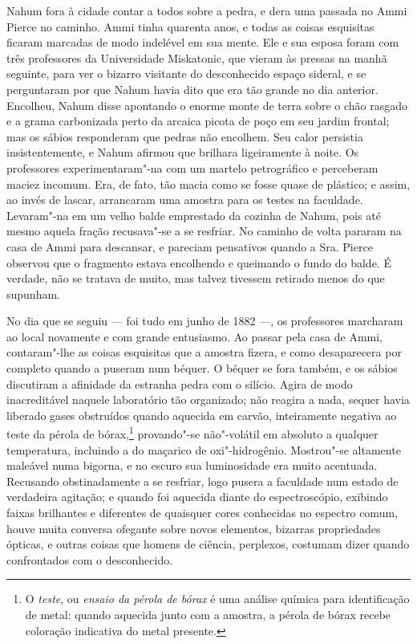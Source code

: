 Nahum fora à cidade contar a todos sobre a pedra, e dera uma passada no
Ammi Pierce no caminho. Ammi tinha quarenta anos, e todas as coisas
esquisitas ficaram marcadas de modo indelével em sua mente. Ele e sua
esposa foram com três professores da Universidade Miskatonic, que vieram
às pressas na manhã seguinte, para ver o bizarro visitante do
desconhecido espaço sideral, e se perguntaram por que Nahum havia dito
que era tão grande no dia anterior. Encolheu, Nahum disse apontando o
enorme monte de terra sobre o chão rasgado e a grama carbonizada perto
da arcaica picota de poço em seu jardim frontal; mas os sábios
responderam que pedras não encolhem. Seu calor persistia
insistentemente, e Nahum afirmou que brilhara ligeiramente à noite. Os
professores experimentaram"-na com um martelo petrográfico e perceberam
maciez incomum. Era, de fato, tão macia como se fosse quase de plástico;
e assim, ao invés de lascar, arrancaram uma amostra para os testes na
faculdade. Levaram"-na em um velho balde emprestado da cozinha de Nahum,
pois até mesmo aquela fração recusava"-se a se resfriar. No caminho de
volta pararam na casa de Ammi para descansar, e pareciam pensativos
quando a Sra. Pierce observou que o fragmento estava encolhendo e
queimando o fundo do balde. É verdade, não se tratava de muito, mas
talvez tivessem retirado menos do que supunham.

No dia que se seguiu --- foi tudo em junho de 1882 ---, os professores
marcharam ao local novamente e com grande entusiasmo. Ao passar pela
casa de Ammi, contaram"-lhe as coisas esquisitas que a amostra fizera, e
como desaparecera por completo quando a puseram num béquer. O béquer se
fora também, e os sábios discutiram a afinidade da estranha pedra com o
silício. Agira de modo inacreditável naquele laboratório tão organizado;
não reagira a nada, sequer havia liberado gases obstruídos quando
aquecida em carvão, inteiramente negativa ao teste da pérola de
bórax,\footnote{O \emph{teste}, ou \emph{ensaio da pérola de bórax} é uma
  análise química para identificação de metal: quando aquecida junto com
  a amostra, a pérola de bórax recebe coloração indicativa do metal
  presente.} provando"-se não"-volátil em absoluto a qualquer
temperatura, incluindo a do maçarico de oxi"-hidrogênio. Mostrou"-se
altamente maleável numa bigorna, e no escuro sua luminosidade era muito
acentuada. Recusando obstinadamente a se resfriar, logo pusera a
faculdade num estado de verdadeira agitação; e quando foi aquecida
diante do espectroscópio, exibindo faixas brilhantes e diferentes de
quaisquer cores conhecidas no espectro comum, houve muita conversa
ofegante sobre novos elementos, bizarras propriedades ópticas, e outras
coisas que homens de ciência, perplexos, costumam dizer quando
confrontados com o desconhecido.

